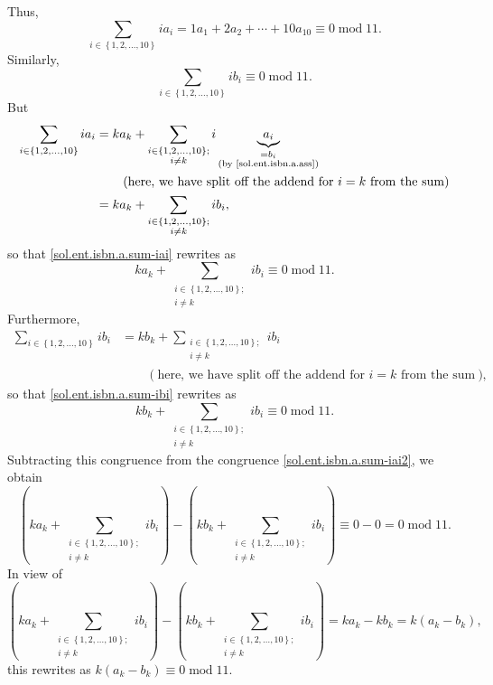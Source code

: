 \documentclass[paper=a4, fontsize=12pt]{scrartcl}%
\let\sumnonlimits\sum
\renewcommand{\sum}{\sumnonlimits\limits}
\theoremstyle{plainsl}
\theoremstyle{definition}
\theoremstyle{remark}
\begin{document}
Thus,%
\begin{equation}
\sum_{i\in\left\{  1,2,\ldots,10\right\}  }ia_{i}=1a_{1}+2a_{2}+\cdots
+10a_{10}\equiv0\operatorname{mod}11. \label{sol.ent.isbn.a.sum-iai}%
\end{equation}
Similarly,%
\begin{equation}
\sum_{i\in\left\{  1,2,\ldots,10\right\}  }ib_{i}\equiv0\operatorname{mod}11.
\label{sol.ent.isbn.a.sum-ibi}%
\end{equation}
But%
\begin{align*}
\sum_{i\in\left\{  1,2,\ldots,10\right\}  }ia_{i}  &  =ka_{k}+\sum
_{\substack{i\in\left\{  1,2,\ldots,10\right\}  ;\\i\neq k}}i\underbrace{a_{i}%
}_{\substack{=b_{i}\\\text{(by \eqref{sol.ent.isbn.a.ass})}}}\\
&  \qquad\left(  \text{here, we have split off the addend for }i=k\text{ from
the sum}\right) \\
&  =ka_{k}+\sum_{\substack{i\in\left\{  1,2,\ldots,10\right\}  ;\\i\neq
k}}ib_{i},
\end{align*}
so that \eqref{sol.ent.isbn.a.sum-iai} rewrites as%
\begin{equation}
ka_{k}+\sum_{\substack{i\in\left\{  1,2,\ldots,10\right\}  ;\\i\neq k}%
}ib_{i}\equiv0\operatorname{mod}11. \label{sol.ent.isbn.a.sum-iai2}%
\end{equation}
Furthermore,%
\begin{align*}
\sum_{i\in\left\{  1,2,\ldots,10\right\}  }ib_{i}  &  =kb_{k}+\sum
_{\substack{i\in\left\{  1,2,\ldots,10\right\}  ;\\i\neq k}}ib_{i}\\
&  \qquad\left(  \text{here, we have split off the addend for }i=k\text{ from
the sum}\right)  ,
\end{align*}
so that \eqref{sol.ent.isbn.a.sum-ibi} rewrites as%
\[
kb_{k}+\sum_{\substack{i\in\left\{  1,2,\ldots,10\right\}  ;\\i\neq k}%
}ib_{i}\equiv0\operatorname{mod}11.
\]
Subtracting this congruence from the congruence
\eqref{sol.ent.isbn.a.sum-iai2}, we obtain
\[
\left(  ka_{k}+\sum_{\substack{i\in\left\{  1,2,\ldots,10\right\}  ;\\i\neq
k}}ib_{i}\right)  -\left(  kb_{k}+\sum_{\substack{i\in\left\{  1,2,\ldots
,10\right\}  ;\\i\neq k}}ib_{i}\right)  \equiv0-0=0\operatorname{mod}11.
\]
In view of
\[
\left(  ka_{k}+\sum_{\substack{i\in\left\{  1,2,\ldots,10\right\}  ;\\i\neq
k}}ib_{i}\right)  -\left(  kb_{k}+\sum_{\substack{i\in\left\{  1,2,\ldots
,10\right\}  ;\\i\neq k}}ib_{i}\right)  =ka_{k}-kb_{k}=k\left(  a_{k}%
-b_{k}\right)  ,
\]
this rewrites as $k\left(  a_{k}-b_{k}\right)  \equiv0\operatorname{mod}11$.
\end{document}

